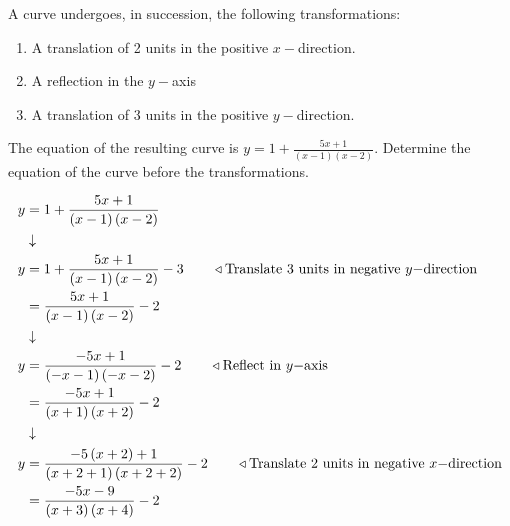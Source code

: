 \documentclass[11pt,a4paper]{book}
\begin{document}
\begin{example}
A curve undergoes, in succession, the following transformations:

\begin{enumerate}[label=\textbf{(\roman*):}]

\item  A translation of 2 units in the positive $x-$direction.

\item  A reflection in the $y-$axis

\item  A translation of $3$ units in the positive $y-$direction.

\end{enumerate}

The equation of the resulting curve is ${\displaystyle y=1+\frac{5x+1}{\left(x-1\right)\left(x-2\right)}}$.
Determine the equation of the curve before the transformations.

\Solution
\begin{align*}
y & =1+\frac{5x+1}{\left(x-1\right)\left(x-2\right)}\\
 & \downarrow\\
y & =1+\frac{5x+1}{\left(x-1\right)\left(x-2\right)}-3\qquad\triangleleft\text{Translate 3 units in negative \ensuremath{y-}direction}\\
 & =\frac{5x+1}{\left(x-1\right)\left(x-2\right)}-2\\
 & \downarrow\\
y & =\frac{-5x+1}{\left(-x-1\right)\left(-x-2\right)}-2\qquad\triangleleft\text{Reflect in \ensuremath{y-}axis}\\
 & =\frac{-5x+1}{\left(x+1\right)\left(x+2\right)}-2\\
 & \downarrow\\
y & =\frac{-5\left(x+2\right)+1}{\left(x+2+1\right)\left(x+2+2\right)}-2\qquad\triangleleft\text{Translate 2 units in negative \ensuremath{x-}direction}\\
 & =\frac{-5x-9}{\left(x+3\right)\left(x+4\right)}-2
\end{align*}
\end{example}
\end{document}
